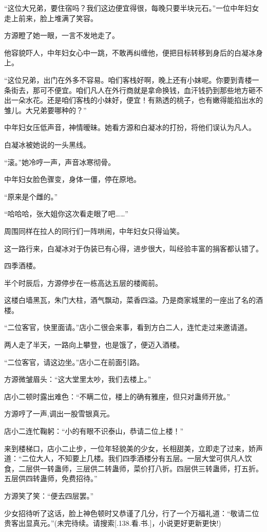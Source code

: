 \begin{this_body}
“这位大兄弟，要住宿吗？我们这边便宜得很，每晚只要半块元石。”一位中年妇女走上前来，脸上堆满了笑容。

方源瞪了她一眼，一言不发地走了。

他容貌吓人，中年妇女心中一跳，不敢再纠缠他，便把目标转移到身后的白凝冰身上。

“这位兄弟，出门在外多不容易。咱们客栈好啊，晚上还有小妹呢。你要到青楼一条街去，那可不便宜。咱们凡人在外行商就是拿命换钱，血汗钱扔到那些地方砸不出一朵水花。还是咱们客栈的小妹好，便宜！有熟透的桃子，也有嫩得能掐出水的雏儿。大兄弟要哪种的？”

中年妇女压低声音，神情暧昧。她看方源和白凝冰的打扮，将他们误认为凡人。

白凝冰被她说的一头黑线。

“滚。”她冷哼一声，声音冰寒彻骨。

中年妇女脸色骤变，身体一僵，停在原地。

“原来是个雌的。”

“哈哈哈，张大姐你这次看走眼了吧……”

周围同样在拉人的同行们一阵哄闹，中年妇女只得讪笑。

这一路行来，白凝冰对于伪装已有心得，进步很大，叫经验丰富的捐客都认错了。

四季酒楼。

半个时辰后，方源停步在一栋高达五层的楼阁前。

这楼白墙黑瓦，朱门大柱，酒气飘动，菜香四溢。乃是商家城里的一座出了名的酒楼。

“二位客官，快里面请。”店小二很会来事，看到方白二人，连忙走过来邀请道。

两人走了半天，一路向上攀登，也是饿了，便迈入酒楼。

“二位客官，请这边坐。”店小二在前面引路。

方源微皱眉头：“这大堂里太吵，我们去楼上。”

店小二顿时露出难色：“不瞒二位，楼上的确有雅座，但只对蛊师开放。”

方源哼了一声,调出一股雪银真元。

店小二连忙鞠躬：“小的有眼不识泰山，恭请二位上楼！”

来到楼梯口，店小二止步，一位年轻貌美的少女，长相甜美，立即走了过来，娇声道：“二位大人，不知要上几楼。我们四季酒楼分有五层。一层大堂可供凡人饮食，二层供一转蛊师，三层供二转蛊师，菜价打八折。四层供三转蛊师，打五折。五层供四转蛊师，免费招待。”

方源笑了笑：“便去四层罢。”

少女招待听了这话，脸上神色顿时又恭谨了几分，行了一个万福礼道：“敬请二位贵客出显真元。”(未完待续。请搜索[.138.看.书.]，小说更好更新更快!)

\end{this_body}

